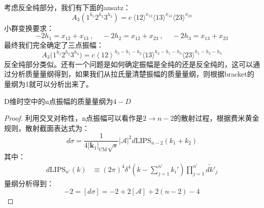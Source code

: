 考虑反全纯部分，我们有下面的ansatz：
\begin{equation}
	A_3{\left(1^{h_1}2^{h_2}3^{h_3}\right)}=c\mathrm{~}\langle12\rangle^{x_{12}}\langle13\rangle^{x_{13}}\langle23\rangle^{x_{23}}
\end{equation}
小群变换要求：
\begin{equation}
	-2h_1=x_{12}+x_{13}\mathrm{~,~}\quad-2h_2=x_{12}+x_{23}\mathrm{~,~}\quad-2h_3=x_{13}+x_{23}
\end{equation}
最终我们完全确定了三点振幅：
\begin{equation}
	\boxed{
		A_3\big(1^{h_1}2^{h_2}3^{h_3}\big)=c\left<12\right>^{h_3-h_1-h_2}\langle13\rangle^{h_2-h_1-h_3}\langle23\rangle^{h_1-h_2-h_3}
	}
\end{equation}
反全纯部分类似。还有一个问题是如何确定振幅是全纯的还是反全纯的，这可以通过分析质量量纲得到，如果我们从拉氏量清楚振幅的质量量纲，则根据bracket的量纲为1就可以分析出来了。
\begin{theorem}
   D维时空中的n点振幅的质量量纲为$4-D$
\end{theorem}
\begin{proof}
	利用交叉对称性，n点振幅可以看作是$2\to n-2$的散射过程，根据费米黄金规则，散射截面表达式为：
	\begin{equation}
		d\sigma=\frac1{4|\mathbf{k}_1|_\text{CM}{ \sqrt { s }}}|\mathcal{A}|^2d\mathrm{LIPS}_{n-2}(k_1{+}k_2)
	\end{equation}
	其中：
	\begin{equation}
		\begin{aligned}d\text{LIPS}_{n'}(k)&\equiv(2\pi)^4\delta^4(k{-}\sum_{j=1}^{n'}k_i')\prod_{j=1}^{n'}\widetilde{dk'}_j\end{aligned}
	\end{equation}
	量纲分析得到：
	\begin{equation}
		-2=[d\sigma]=-2+2[\mathcal{A}]+2(n-2)-4
	\end{equation}
\end{proof}

